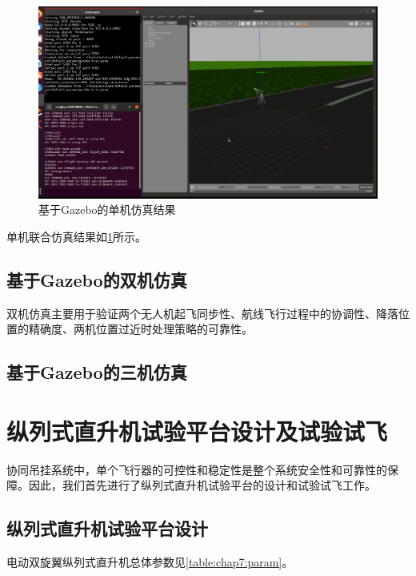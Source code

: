 \begin{figure}[htb!]
    \centering
    \includegraphics[width = 14cm]{fig/figure_chap7/apm1_simulation.png}
    \caption{基于Gazebo的单机仿真结果\label{fig:apm1_simulation}}
\end{figure}
单机联合仿真结果如\ref{fig:apm1_simulation}所示。

\subsection{基于Gazebo的双机仿真}
双机仿真主要用于验证两个无人机起飞同步性、航线飞行过程中的协调性、降落位置的精确度、两机位置过近时处理策略的可靠性。


\subsection{基于Gazebo的三机仿真}


\section{纵列式直升机试验平台设计及试验试飞}
协同吊挂系统中，单个飞行器的可控性和稳定性是整个系统安全性和可靠性的保障。因此，我们首先进行了纵列式直升机试验平台的设计和试验试飞工作。

\subsection{纵列式直升机试验平台设计}
电动双旋翼纵列式直升机总体参数见\ref{table:chap7:param}。

